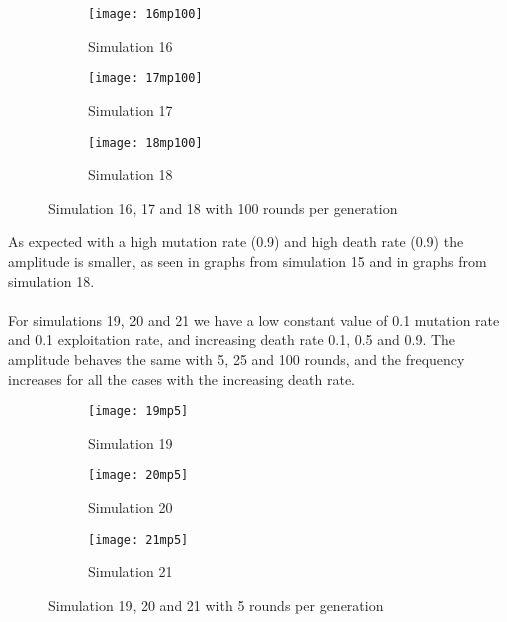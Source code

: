 \begin{figure}[H]       
    \centering
    \begin{subfigure}[b]{0.3\textwidth}
	\centering
	{\texttt{[image: 16mp100]}}   
    	\caption{Simulation 16}
	\label{fig:mpsim16100}
    \end{subfigure}
    \hfill
    \begin{subfigure}[b]{0.3\textwidth}
	\centering
	{\texttt{[image: 17mp100]}}   
    	\caption{Simulation 17}
	\label{fig:mpsim17100}
    \end{subfigure}
    \hfill
    \begin{subfigure}[b]{0.3\textwidth}
	\centering
	{\texttt{[image: 18mp100]}}   
    	\caption{Simulation 18}
	\label{fig:mpsim18100}
    \end{subfigure}
    \caption{Simulation 16, 17 and 18 with 100 rounds per generation}
    \label{mpsim161718simulations100}
\end{figure}

As expected with a high mutation rate (0.9) and high death rate (0.9) the amplitude is smaller, as seen in graphs from simulation 15 and in graphs from simulation 18.
\\\\For simulations 19, 20 and 21 we have a low constant value of 0.1 mutation rate and 0.1 exploitation rate, and increasing death rate 0.1, 0.5 and 0.9. The amplitude behaves the same with 5, 25 and 100 rounds, and the frequency increases for all the cases with the increasing death rate.

\begin{figure}[H]       
    \centering
    \begin{subfigure}[b]{0.3\textwidth}
	\centering
	{\texttt{[image: 19mp5]}}   
    	\caption{Simulation 19}
	\label{fig:mpsim195}
    \end{subfigure}
    \hfill
    \begin{subfigure}[b]{0.3\textwidth}
	\centering
	{\texttt{[image: 20mp5]}}   
    	\caption{Simulation 20}
	\label{fig:mpsim205}
    \end{subfigure}
    \hfill
    \begin{subfigure}[b]{0.3\textwidth}
	\centering
	{\texttt{[image: 21mp5]}}   
    	\caption{Simulation 21}
	\label{fig:mpsim215}
    \end{subfigure}
    \caption{Simulation 19, 20 and 21 with 5 rounds per generation}
    \label{mpsim192021simulations5}
\end{figure}


